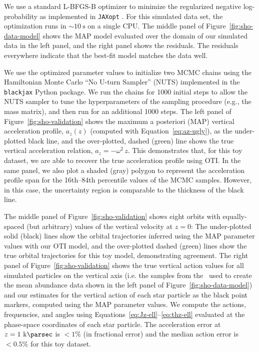 We use a standard L-BFGS-B optimizer \citep{Byrd:1995} to minimize the regularized
negative log-probability as implemented in \texttt{JAXopt} \cite{jaxopt:2021}.
For this simulated data set, the optimization runs in $\sim 10~\unit{\second}$ on a
single CPU.
The middle panel of Figure~\ref{fig:sho-data-model} shows the MAP model evaluated over
the domain of our simulated data in the left panel, and the right panel shows the
residuals.
The residuals everywhere indicate that the best-fit model matches the data well.

We use the optimized parameter values to initialize two MCMC chains using the
Hamiltonian Monte Carlo ``No U-turn Sampler'' (NUTS) implemented in the
\texttt{blackjax} \citep{blackjax} Python package.
We run the chains for 1000 initial steps to allow the NUTS sampler to tune the
hyperparameters of the sampling procedure (e.g., the mass matrix), and then run for an
additional 1000 steps.
The left panel of Figure~\ref{fig:sho-validation} shows the maximum a posteriori (MAP)
vertical acceleration profile, $a_z(z)$ (computed with Equation~\ref{eq:az-ugly}), as
the under-plotted black line, and the over-plotted, dashed (green) line shows the true
vertical acceleration relation, $a_z = -\omega^2 \, z$.
This demonstrates that, for this toy dataset, we are able to recover the true
acceleration profile using OTI.
In the same panel, we also plot a shaded (gray) polygon to represent the acceleration
profile span for the 16th--84th percentile values of the MCMC samples.
However, in this case, the uncertainty region is comparable to the thickness of the
black line.

The middle panel of Figure~\ref{fig:sho-validation} shows eight orbits with
equally-spaced (but arbitrary) values of the vertical velocity at $z=0$: The
under-plotted solid (black) lines show the orbital trajectories inferred using the MAP
parameter values with our OTI model, and the over-plotted dashed (green) lines show the
true orbital trajectories for this toy model, demonstrating agreement.
The right panel of Figure~\ref{fig:sho-validation} shows the true vertical action values
for all simulated particles on the vertical axis (i.e. the samples from the \df\ used to
create the mean abundance data shown in the left panel of
Figure~\ref{fig:sho-data-model}) and our estimates for the vertical action of each star
particle as the black point markers, computed using the MAP parameter values.
We compute the actions, frequencies, and angles using
Equations~\ref{eq:Jz-ell}--\ref{eq:thz-ell} evaluated at the phase-space coordinates of
each star particle.
The acceleration error at $z=1~\kpc$ is $< 1\%$ (in fractional error) and the median
action error is $<0.5\%$ for this toy dataset.


